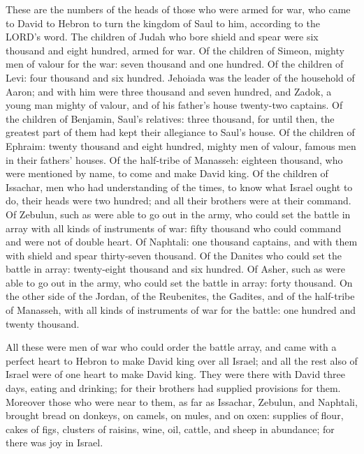  These are the numbers of the heads of those who were
armed for war, who came to David to Hebron to turn the kingdom of Saul
to him, according to the LORD's word.  The children of
Judah who bore shield and spear were six thousand and eight hundred,
armed for war.  Of the children of Simeon, mighty men of
valour for the war: seven thousand and one hundred.  Of
the children of Levi: four thousand and six hundred. 
Jehoiada was the leader of the household of Aaron; and with him were
three thousand and seven hundred,  and Zadok, a young man
mighty of valour, and of his father's house twenty-two captains.
 Of the children of Benjamin, Saul's relatives: three
thousand, for until then, the greatest part of them had kept their
allegiance to Saul's house.  Of the children of Ephraim:
twenty thousand and eight hundred, mighty men of valour, famous men in
their fathers' houses.  Of the half-tribe of Manasseh:
eighteen thousand, who were mentioned by name, to come and make David
king.  Of the children of Issachar, men who had
understanding of the times, to know what Israel ought to do, their heads
were two hundred; and all their brothers were at their command.
 Of Zebulun, such as were able to go out in the army, who
could set the battle in array with all kinds of instruments of war:
fifty thousand who could command and were not of double heart.
 Of Naphtali: one thousand captains, and with them with
shield and spear thirty-seven thousand.  Of the Danites
who could set the battle in array: twenty-eight thousand and six
hundred.  Of Asher, such as were able to go out in the
army, who could set the battle in array: forty thousand. 
On the other side of the Jordan, of the Reubenites, the Gadites, and of
the half-tribe of Manasseh, with all kinds of instruments of war for the
battle: one hundred and twenty thousand.

 All these were men of war who could order the battle
array, and came with a perfect heart to Hebron to make David king over
all Israel; and all the rest also of Israel were of one heart to make
David king.  They were there with David three days,
eating and drinking; for their brothers had supplied provisions for
them.  Moreover those who were near to them, as far as
Issachar, Zebulun, and Naphtali, brought bread on donkeys, on camels, on
mules, and on oxen: supplies of flour, cakes of figs, clusters of
raisins, wine, oil, cattle, and sheep in abundance; for there was joy in
Israel.

